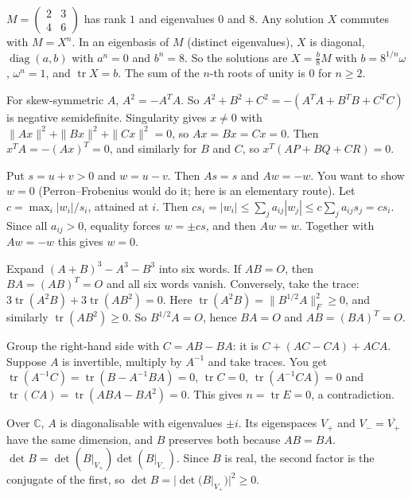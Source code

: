 \documentclass[11pt,a4paper]{article}
\begin{document}

\(M=\begin{pmatrix}2&3\\4&6\end{pmatrix}\) has rank \(1\) and eigenvalues \(0\) and \(8\). Any solution \(X\) commutes with \(M=X^n\).
In an eigenbasis of \(M\) (distinct eigenvalues), \(X\) is diagonal, \(\operatorname{diag}(a,b)\) with \(a^n=0\) and \(b^n=8\). So the solutions are \(X=\frac{b}{8}M\) with \(b=8^{1/n}\omega\), \(\omega^n=1\), and \(\operatorname{tr}X=b\). The sum of the \(n\)-th roots of unity is \(0\) for \(n\ge2\).

For skew-symmetric \(A\), \(A^2=-A^TA\). So \(A^2+B^2+C^2=-(A^TA+B^TB+C^TC)\) is negative semidefinite.
Singularity gives \(x\ne0\) with \(\|Ax\|^2+\|Bx\|^2+\|Cx\|^2=0\), so \(Ax=Bx=Cx=0\). Then \(x^TA=-(Ax)^T=0\), and similarly for \(B\) and \(C\), so \(x^T(AP+BQ+CR)=0\).

Put \(s=u+v>0\) and \(w=u-v\). Then \(As=s\) and \(Aw=-w\). You want to show \(w=0\) (Perron--Frobenius would do it; here is an elementary route).
Let \(c=\max_i|w_i|/s_i\), attained at \(i\). Then \(cs_i=|w_i|\le\sum_ja_{ij}|w_j|\le c\sum_ja_{ij}s_j=cs_i\). Since all \(a_{ij}>0\), equality forces \(w=\pm cs\), and then \(Aw=w\). Together with \(Aw=-w\) this gives \(w=0\).

Expand \((A+B)^3-A^3-B^3\) into six words. If \(AB=O\), then \(BA=(AB)^T=O\) and all six words vanish.
Conversely, take the trace: \(3\operatorname{tr}(A^2B)+3\operatorname{tr}(AB^2)=0\). Here \(\operatorname{tr}(A^2B)=\|B^{1/2}A\|_F^2\ge0\), and similarly \(\operatorname{tr}(AB^2)\ge0\). So \(B^{1/2}A=O\), hence \(BA=O\) and \(AB=(BA)^T=O\).

Group the right-hand side with \(C=AB-BA\): it is \(C+(AC-CA)+ACA\).
Suppose \(A\) is invertible, multiply by \(A^{-1}\) and take traces. You get \(\operatorname{tr}(A^{-1}C)=\operatorname{tr}(B-A^{-1}BA)=0\), \(\operatorname{tr}C=0\), \(\operatorname{tr}(A^{-1}CA)=0\) and \(\operatorname{tr}(CA)=\operatorname{tr}(ABA-BA^2)=0\). This gives \(n=\operatorname{tr}E=0\), a contradiction.

Over \(\mathbb C\), \(A\) is diagonalisable with eigenvalues \(\pm i\). Its eigenspaces \(V_+\) and \(V_-=\overline{V_+}\) have the same dimension, and \(B\) preserves both because \(AB=BA\).
\(\det B=\det(B|_{V_+})\det(B|_{V_-})\). Since \(B\) is real, the second factor is the conjugate of the first, so \(\det B=|\det(B|_{V_+})|^2\ge0\).
\end{document}
